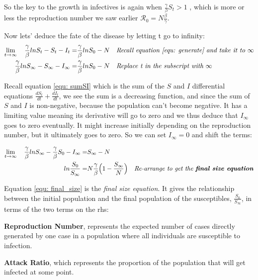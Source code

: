 \documentclass[fontsize=17pt]{article}
\begin{document}
So the key to the growth in infectives is again when $\frac{\gamma}{\beta}S_{t}>1$ , which is more or less the reproduction number we saw earlier $\mathscr{R}_{0}=N\frac{\beta}{\gamma}$.

Now lets' deduce the fate of the disease by letting t go to infinity:
\begin{align}
\lim_{t\to\infty}\quad \frac{\gamma}{\beta}lnS_{t}-S_{t}-I_{t}=&\frac{\gamma}{\beta}lnS_{0}-N&&\text{\textit{Recall equation \ref{equ: generate} and take it to $\infty$}}\\
\frac{\gamma}{\beta}lnS_{\infty}-S_{\infty}-I_{\infty}=&\frac{\gamma}{\beta}lnS_{0}-N&&\text{\textit{Replace t in the subscript with $\infty$}}
\end{align}

Recall equation \ref{equ: sumSI} which is the sum of the $S$ and $I$ differential equations $\frac{dS_{t}}{dt}+\frac{dI_{t}}{dt}$, we see the sum is a decreasing function, and since the sum of $S$ and $I$ is non-negative, because the population can't become negative. It has a limiting value meaning its derivative will go to zero and we thus deduce that $I_{\infty}$ goes to zero eventually. It might increase initially depending on the reproduction number, but it ultimately goes to zero. So we can set $I_{\infty}=0$ and shift the terms: 

\begin{align}
\lim_{t\to\infty}\quad \frac{\gamma}{\beta}lnS_{\infty}-\frac{\gamma}{\beta}S_{0}-I_{\infty}=&S_{\infty}-N&&\\\label{equ: final_size}ln\frac{S_{0}}{S_{\infty}}=&N\frac{\gamma}{\beta}\Bigl(1-\frac{S_{\infty}}{N}\Bigl)&&\text{\textit{Re-arrange to get the \textbf{final size equation}}}
\end{align}

Equation \ref{equ: final_size} is the \textit{final size equation}. It gives the relationship between the initial population and the final population of the susceptibles, $\frac{S_{0}}{S_{\infty}}$, in terms of the two terms on the rhs:

\begin{description}[leftmargin=!,labelwidth=\widthof{\bfseries Susceptibles}]
	
	\item[$\mathscr{R}_{0}=N\frac{\beta}{\gamma}$] \textbf{Reproduction Number}, represents the expected number of cases directly generated by one case in a population where all individuals are susceptible to infection.
	\item[$\Bigl(1-\frac{S_{\infty}}{N}\Bigl)$] \textbf{Attack Ratio}, which represents the proportion of the population that will get infected at some point.
	
\end{description}
\end{document}
